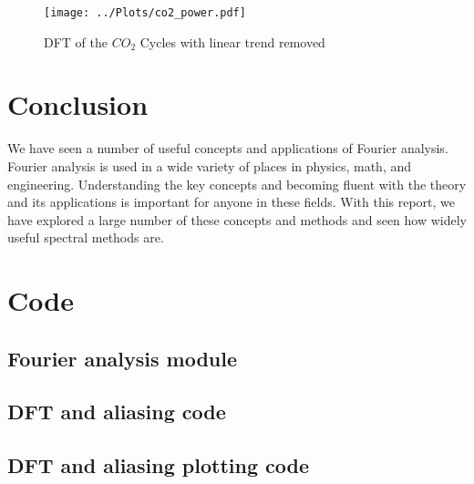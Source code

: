 \documentclass[twocolumn]{myarticle}
\begin{document}
\begin{figure}[ht]
    \centering
    \texttt{[image: ../Plots/co2\_power.pdf]}
    \caption{DFT of the $CO_{2}$ Cycles with linear trend removed}
    \label{fig:co2_power}
\end{figure}

\section{Conclusion}
\label{sec:conclusion}

We have seen a number of useful concepts and applications of Fourier analysis.
Fourier analysis is used in a wide variety of places in physics, math, and engineering.
Understanding the key concepts and becoming fluent with the theory and its applications is important for anyone in these fields.
With this report, we have explored a large number of these concepts and methods and seen how widely useful spectral methods are.

\onecolumn

\section{Code}
\label{sec:code}

\subsection{Fourier analysis module}
\label{subsec:fourier_analysis_module}


\vspace{10pt}

\subsection{DFT and aliasing code}
\label{subsec:dft_and_aliasing_code}


\vspace{10pt}

\subsection{DFT and aliasing plotting code}
\label{subsec:dft_and_aliasing_plotting_code}


\vspace{10pt}
\end{document}
